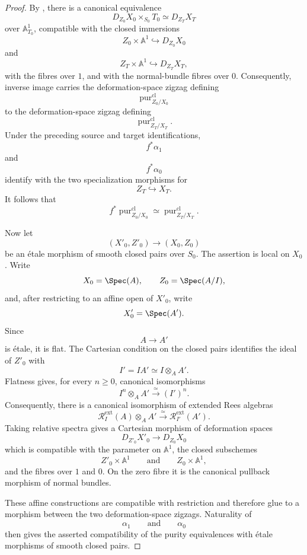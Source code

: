 \begin{proof}
By
,
there is a canonical equivalence
\[
    D_{Z_0}X_0
    \times_{S_0}
    T_0
    \simeq
    D_{Z_T}X_T
\]
over \(\mathbb A^1_{T_0}\), compatible with the closed immersions
\[
    Z_0\times\mathbb A^1
    \hookrightarrow
    D_{Z_0}X_0
\]
and
\[
    Z_T\times\mathbb A^1
    \hookrightarrow
    D_{Z_T}X_T,
\]
with the fibres over \(1\), and with the normal-bundle fibres over
\(0\).  Consequently, inverse image carries the deformation-space
zigzag defining
\[
    \operatorname{pur}^{\mathrm{cl}}_{Z_0/X_0}
\]
to the deformation-space zigzag defining
\[
    \operatorname{pur}^{\mathrm{cl}}_{Z_T/X_T}.
\]
Under the preceding source and target identifications,
\[
    f^*\alpha_1
\]
and
\[
    f^*\alpha_0
\]
identify with the two specialization morphisms for
\[
    Z_T
    \hookrightarrow
    X_T.
\]
It follows that
\[
    f^*
    \operatorname{pur}^{\mathrm{cl}}_{Z_0/X_0}
    \simeq
    \operatorname{pur}^{\mathrm{cl}}_{Z_T/X_T}.
\]

Now let
\[
    (X'_0,Z'_0)
    \longrightarrow
    (X_0,Z_0)
\]
be an étale morphism of smooth closed pairs over \(S_0\).  The assertion
is local on \(X_0\).  Write
\[
    X_0
    =
    \Spec(A),
    \qquad
    Z_0
    =
    \Spec(A/I),
\]
and, after restricting to an affine open of \(X'_0\), write
\[
    X'_0
    =
    \Spec(A').
\]
Since
\[
    A
    \longrightarrow
    A'
\]
is étale, it is flat.  The Cartesian condition on the closed pairs
identifies the ideal of \(Z'_0\) with
\[
    I'
    =
    IA'
    \simeq
    I\otimes_AA'.
\]
Flatness gives, for every \(n\geq0\), canonical isomorphisms
\[
    I^n\otimes_AA'
    \xrightarrow{\simeq}
    (I')^n.
\]
Consequently, there is a canonical isomorphism of extended Rees
algebras
\[
    \mathcal R_I^{\mathrm{ext}}(A)
    \otimes_A
    A'
    \xrightarrow{\simeq}
    \mathcal R_{I'}^{\mathrm{ext}}(A').
\]
Taking relative spectra gives a Cartesian morphism of deformation
spaces
\[
    D_{Z'_0}X'_0
    \longrightarrow
    D_{Z_0}X_0
\]
which is compatible with the parameter on \(\mathbb A^1\), the closed
subschemes
\[
    Z'_0\times\mathbb A^1
    \qquad\text{and}\qquad
    Z_0\times\mathbb A^1,
\]
and the fibres over \(1\) and \(0\).  On the zero fibre it is the
canonical pullback morphism of normal bundles.

These affine constructions are compatible with restriction and
therefore glue to a morphism between the two deformation-space
zigzags.  Naturality of
\[
    \alpha_1
    \qquad\text{and}\qquad
    \alpha_0
\]
then gives the asserted compatibility of the purity equivalences with
étale morphisms of smooth closed pairs.
\end{proof}

